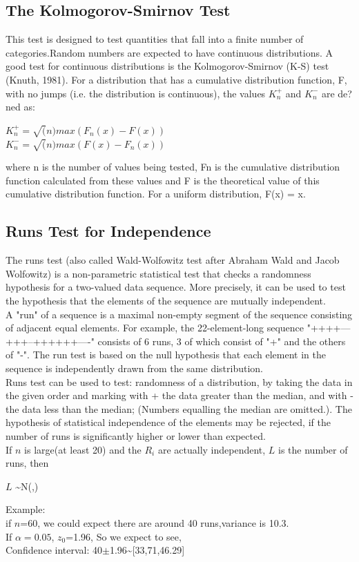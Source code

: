 \documentclass[a4paper,11pt]{article}
\begin{document}
{\subsection{The Kolmogorov-Smirnov Test}
{This test is designed to test quantities that fall into a finite number of categories.Random numbers are expected to have continuous distributions. A good test for continuous distributions is the Kolmogorov-Smirnov (K-S) test (Knuth, 1981). For a distribution that has a cumulative distribution function, F, with no jumps (i.e. the distribution is continuous), the values $K^+_n$ and $K^-_n$ are de?ned as:
\begin{center}
$K^+_n= \sqrt(n) max(F_n(x)-F(x))$\\
$K^-_n=  \sqrt(n) max(F(x)-F_n(x))$\\
\end{center}
where n is the number of values being tested, Fn is the cumulative distribution function calculated from these values and F is the theoretical value of this cumulative distribution function. For a uniform distribution, F(x) = x.
}
\subsection{Runs Test for Independence}
{The runs test (also called Wald-Wolfowitz test after Abraham Wald and Jacob Wolfowitz) is a non-parametric statistical test that checks a randomness hypothesis for a two-valued data sequence. More precisely, it can be used to test the hypothesis that the elements of the sequence are mutually independent.\\

A "run" of a sequence is a maximal non-empty segment of the sequence consisting of adjacent equal elements. For example, the 22-element-long sequence "++++---+++--++++++----" consists of 6 runs, 3 of which consist of "+" and the others of "-". The run test is based on the null hypothesis that each element in the sequence is independently drawn from the same distribution.\\
Runs test can be used to test: randomness of a distribution, by taking the data in the given order and marking with + the data greater than the median, and with - the data less than the
median; (Numbers equalling the median are omitted.). The hypothesis of statistical independence of the elements may be rejected, if the number of runs is significantly higher or lower than expected. \\
If $n$ is large(at least 20) and the $R_i$ are actually independent, $L$ is the number of runs, then\\
\begin{center}
$L$ \sim N(,)\\
\end{center}
Example:\\
 if $n$=60, we could expect there are around 40 runs,variance is 10.3. \\
If $\alpha=0.05$, $z_0$=1.96, So we expect to see, \\ Confidence interval: 40$\pm$1.96\sim [33,71,46.29]\\
}
}
\end{document}
